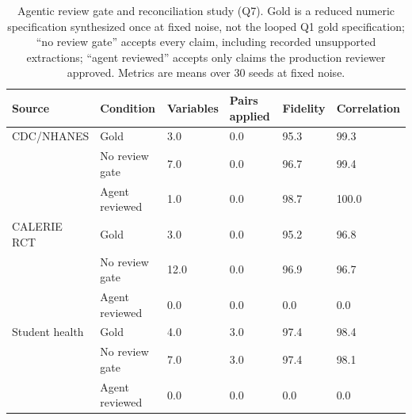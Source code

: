 \documentclass[letterpaper]{article}
\begin{document}
\begin{table}[t]
\centering
\begin{tabular}{llllll}
\toprule
Source & Condition & Variables & Pairs applied & Fidelity & Correlation \\
\midrule
CDC/NHANES & Gold & 3.0 & 0.0 & 95.3 & 99.3 \\
 & No review gate & 7.0 & 0.0 & 96.7 & 99.4 \\
 & Agent reviewed & 1.0 & 0.0 & 98.7 & 100.0 \\
\midrule
CALERIE RCT & Gold & 3.0 & 0.0 & 95.2 & 96.8 \\
 & No review gate & 12.0 & 0.0 & 96.9 & 96.7 \\
 & Agent reviewed & 0.0 & 0.0 & 0.0 & 0.0 \\
\midrule
Student health & Gold & 4.0 & 3.0 & 97.4 & 98.4 \\
 & No review gate & 7.0 & 3.0 & 97.4 & 98.1 \\
 & Agent reviewed & 0.0 & 0.0 & 0.0 & 0.0 \\
\bottomrule
\end{tabular}
\caption{Agentic review gate and reconciliation study (Q7). Gold is a reduced
numeric specification synthesized once at fixed noise, not the looped Q1 gold
specification; ``no review gate'' accepts every claim, including recorded
unsupported extractions; ``agent reviewed'' accepts only claims the production
reviewer approved. Metrics are means over 30 seeds at fixed noise.}
\label{tab:review_gate}
\end{table}


\end{document}
